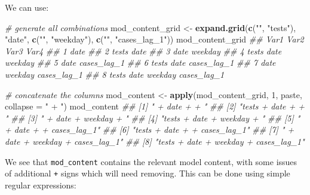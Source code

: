 \documentclass[]{book}
\newenvironment{Shaded}{\begin{snugshade}}{\end{snugshade}}
\newcommand{\CommentTok}[1]{\textcolor[rgb]{0.56,0.35,0.01}{\textit{#1}}}
\newcommand{\DataTypeTok}[1]{\textcolor[rgb]{0.13,0.29,0.53}{#1}}
\newcommand{\DecValTok}[1]{\textcolor[rgb]{0.00,0.00,0.81}{#1}}
\newcommand{\KeywordTok}[1]{\textcolor[rgb]{0.13,0.29,0.53}{\textbf{#1}}}
\newcommand{\NormalTok}[1]{#1}
\newcommand{\StringTok}[1]{\textcolor[rgb]{0.31,0.60,0.02}{#1}}
\begin{document}
We can use:

\begin{Shaded}
\begin{Highlighting}[]

\CommentTok{# generate all combinations}
\NormalTok{mod_content_grid <-}\StringTok{ }\KeywordTok{expand.grid}\NormalTok{(}\KeywordTok{c}\NormalTok{(}\StringTok{""}\NormalTok{, }\StringTok{"tests"}\NormalTok{),}
                                \StringTok{"date"}\NormalTok{,}
                                \KeywordTok{c}\NormalTok{(}\StringTok{""}\NormalTok{, }\StringTok{"weekday"}\NormalTok{),}
                                \KeywordTok{c}\NormalTok{(}\StringTok{""}\NormalTok{, }\StringTok{"cases_lag_1"}\NormalTok{))}
\NormalTok{mod_content_grid}
\CommentTok{##    Var1 Var2    Var3        Var4}
\CommentTok{## 1       date                    }
\CommentTok{## 2 tests date                    }
\CommentTok{## 3       date weekday            }
\CommentTok{## 4 tests date weekday            }
\CommentTok{## 5       date         cases_lag_1}
\CommentTok{## 6 tests date         cases_lag_1}
\CommentTok{## 7       date weekday cases_lag_1}
\CommentTok{## 8 tests date weekday cases_lag_1}

\CommentTok{# concatenate the columns}
\NormalTok{mod_content <-}\StringTok{ }\KeywordTok{apply}\NormalTok{(mod_content_grid, }\DecValTok{1}\NormalTok{, paste, }\DataTypeTok{collapse =} \StringTok{" + "}\NormalTok{)}
\NormalTok{mod_content}
\CommentTok{## [1] " + date +  + "                       }
\CommentTok{## [2] "tests + date +  + "                  }
\CommentTok{## [3] " + date + weekday + "                }
\CommentTok{## [4] "tests + date + weekday + "           }
\CommentTok{## [5] " + date +  + cases_lag_1"            }
\CommentTok{## [6] "tests + date +  + cases_lag_1"       }
\CommentTok{## [7] " + date + weekday + cases_lag_1"     }
\CommentTok{## [8] "tests + date + weekday + cases_lag_1"}
\end{Highlighting}
\end{Shaded}

We see that \texttt{mod\_content} contains the relevant model content, with some
issues of additional \texttt{+} signs which will need removing. This can be done using
simple regular expressions:
\end{document}
